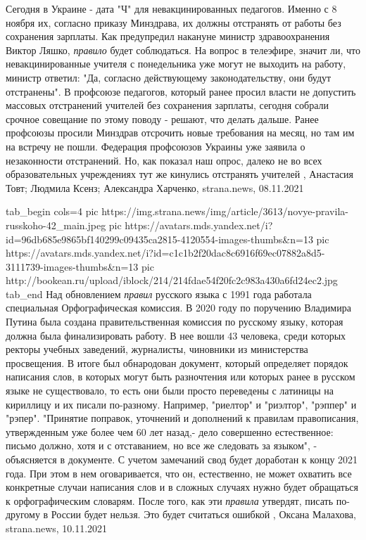 Сегодня в Украине - дата "Ч" для невакцинированных педагогов.  Именно с 8 ноября
их, согласно приказу Минздрава, их должны отстранять от работы без сохранения
зарплаты.  Как предупредил накануне министр здравоохранения Виктор Ляшко,
\emph{правило} будет соблюдаться. На вопрос в телеэфире, значит ли, что
невакцинированные учителя с понедельника уже могут не выходить на работу,
министр ответил: "Да, согласно действующему законодательству, они будут
отстранены". В профсоюзе педагогов, который ранее просил власти не допустить
массовых отстранений учителей без сохранения зарплаты, сегодня собрали срочное
совещание по этому поводу - решают, что делать дальше. Ранее профсоюзы просили
Минздрав отсрочить новые требования на месяц, но там им на встречу не пошли.
Федерация профсоюзов Украины уже заявила о незаконности отстранений.  Но, как
показал наш опрос, далеко не во всех образовательных учреждениях тут же
кинулись отстранять учителей
, 
Анастасия Товт; Людмила Ксенз; Александра Харченко, strana.news, 08.11.2021

\ifcmt
  tab_begin cols=4
     pic https://img.strana.news/img/article/3613/novye-pravila-russkoho-42_main.jpeg
		 pic https://avatars.mds.yandex.net/i?id=96db685e9865bf140299c09435ca2815-4120554-images-thumbs&n=13
		 pic https://avatars.mds.yandex.net/i?id=c1c1b2f20dac8c6916f69ec07882a8d5-3111739-images-thumbs&n=13
		 pic http://bookean.ru/upload/iblock/214/214fdae54f20fc2c983a430a6fd24ec2.jpg
  tab_end
\fi
Над обновлением \emph{правил} русского языка с 1991 года работала специальная
Орфографическая комиссия.  В 2020 году по поручению Владимира Путина была
создана правительственная комиссия по русскому языку, которая должна была
финализировать работу. В нее вошли 43 человека, среди которых ректоры учебных
заведений, журналисты, чиновники из министерства просвещения.  В итоге был
обнародован документ, который определяет порядок написания слов, в которых
могут быть разночтения или которых ранее в русском языке не существовало, то
есть они были просто переведены с латиницы на кириллицу и их писали по-разному.
Например, "риелтор" и "риэлтор", "рэппер" и "рэпер".  "Принятие поправок,
уточнений и дополнений к правилам правописания, утвержденным уже более чем 60
лет назад,- дело совершенно естественное: письмо должно, хотя и с отставанием,
но все же следовать за языком", - объясняется в документе.  С учетом замечаний
свод будет доработан к концу 2021 года. При этом в нем оговаривается, что он,
естественно, не может охватить все конкретные случаи написания слов и в сложных
случаях нужно будет обращаться к орфографическим словарям.  После того, как эти
\emph{правила} утвердят, писать по-другому в России будет нельзя.  Это будет считаться
ошибкой
, 
Оксана Малахова, strana.news, 10.11.2021
